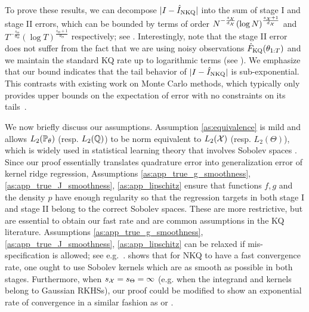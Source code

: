 To prove these results, we can decompose $| I - \hat{I}_{\text{NKQ}}|$ into the sum of stage I and stage II errors, which can be bounded by terms of order $
N^{- \frac{ s_{\mathcal{X}}}{d_{\mathcal{X}}}} (\log N)^{\frac{s_{\mathcal{X}}+1}{d_{\mathcal{X}}}}$ and $T^{- \frac{ s_\Theta}{d_\Theta}} (\log T)^{\frac{s_\Theta+1}{d_\Theta}}$ respectively; 
see  . 
Interestingly, note that the stage II error does not suffer from the fact that we are using noisy observations $\hat{F}_{\text{KQ}}(\theta_{1:T})$ and we maintain the standard KQ rate up to logarithmic terms (see ).
We emphasize that our bound indicates that the tail behavior of $|I - \hat{I}_{\text{NKQ}}|$ is sub-exponential. This contrasts with existing work on Monte Carlo methods, which typically only provides upper bounds on the expectation of error with no constraints on its tails~\citep{Giles2015, Bartuska2023}.

We now briefly discuss our assumptions.
Assumption \ref{as:equivalence} is mild and allows $L_2(\mathbb{P}_\theta)$ (resp. $L_2(\mathbb{Q})$) to be norm equivalent to $L_2(\mathcal{X})$ (resp. $L_2(\Theta)$), which is widely used in statistical learning theory that involves Sobolev spaces \citep{fischer2020sobolev, suzuki2021deep}.
Since our proof essentially translates quadrature error into generalization error of  kernel ridge regression, Assumptions \ref{as:app_true_g_smoothness}, \ref{as:app_true_J_smoothness}, \ref{as:app_lipschitz} ensure that functions $f, g$ and the density $p$ have enough regularity so that the regression targets in both stage I and stage II belong to the correct Sobolev spaces. These are more restrictive, but are essential to obtain our fast rate and are common assumptions in the KQ literature.
Assumptions \ref{as:app_true_g_smoothness}, \ref{as:app_true_J_smoothness}, \ref{as:app_lipschitz} can be relaxed if mis-specification is allowed; see e.g.~\citet{fischer2020sobolev,Kanagawa2019, zhang2023optimality}. 
 shows that for NKQ to have a fast convergence rate, one ought to use Sobolev kernels which are as smooth as possible in both stages.
Furthermore, when $s_{\mathcal{X}} = s_\Theta = \infty$ (e.g. when the integrand and kernels belong to Gaussian RKHSs), our proof could be modified to show an exponential rate of convergence in a similar fashion as \citet[Theorem 10]{briol2018statistical} or \citet{Karvonen2020}.

